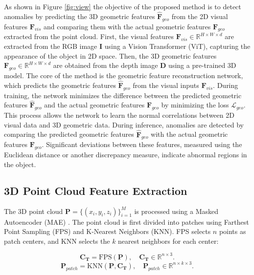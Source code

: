 As shown in Figure \ref{fig:view} the objective of the proposed method is to detect anomalies by predicting the 3D geometric features $\hat{\mathbf{F}}_{geo}$ from the 2D visual features $\mathbf{F}_{vis}$ and comparing them with the actual geometric features $\mathbf{F}_{geo}$ extracted from the point cloud. First, the visual features $\mathbf{F}_{vis} \in \mathbb{R}^{H \times W \times d}$ are extracted from the RGB image $\mathbf{I}$ using a Vision Transformer (ViT), capturing the appearance of the object in 2D space. Then, the 3D geometric features $\mathbf{F}_{geo} \in \mathbb{R}^{H \times W \times d}$ are obtained from the depth image $\mathbf{D}$ using a pre-trained 3D model. The core of the method is the geometric feature reconstruction network, which predicts the geometric features $\hat{\mathbf{F}}_{geo}$ from the visual inputs $\mathbf{F}_{vis}$. During training, the network minimizes the difference between the predicted geometric features $\hat{\mathbf{F}}_{geo}$ and the actual geometric features $\mathbf{F}_{geo}$ by minimizing the loss $\mathcal{L}_{geo}$. This process allows the network to learn the normal correlations between 2D visual data and 3D geometric data. During inference, anomalies are detected by comparing the predicted geometric features $\hat{\mathbf{F}}_{geo}$ with the actual geometric features $\mathbf{F}_{geo}$. Significant deviations between these features, measured using the Euclidean distance or another discrepancy measure, indicate abnormal regions in the object.

\subsection*{3D Point Cloud Feature Extraction}

The 3D point cloud $\mathbf{P} = \{(x_i, y_i, z_i)\}_{i=1}^{M}$ is processed using a Masked Autoencoder (MAE) \cite{pang2022masked}. The point cloud is first divided into patches using Farthest Point Sampling (FPS) and K-Nearest Neighbors (KNN). FPS selects $n$ points as patch centers, and KNN selects the $k$ nearest neighbors for each center:

\begin{equation}
    \mathbf{C_T} = \text{FPS}(\mathbf{P}), \quad \mathbf{C_T} \in \mathbb{R}^{n \times 3}.
\end{equation}
\begin{equation}
    \mathbf{P}_{patch} = \text{KNN}(\mathbf{P}, \mathbf{C_T}), \quad \mathbf{P}_{patch} \in \mathbb{R}^{n \times k \times 3}.
\end{equation}

